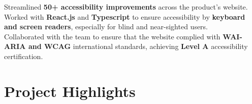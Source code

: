 \documentclass[]{Nikhil_Kadiyan_Resume}
\begin{document}
\pt Streamlined \textbf{50+ accessibility improvements} across the product's website.\\
\pt Worked with \textbf{React.js} and \textbf{Typescript} to ensure accessibility by \textbf{keyboard and screen readers}, especially for blind and near-sighted users.\\
\pt Collaborated with the team to ensure that the website complied with \textbf{WAI-ARIA and WCAG} international standards, achieving \textbf{Level A} accessibility certification.\\
\sectionsep



\section{Project Highlights}
\hrulefill


\end{document}

